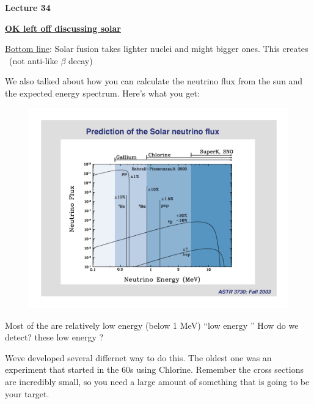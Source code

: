 \usepackage{fancyhdr}

\fancyhf{}


\thispagestyle{fancy}

\begin{center}
{\huge \textbf{Lecture 34}}
\end{center}

{\fontsize{14}{16}\selectfont

\textbf{\underline{OK left off discussing solar \nus}} 

\underline{Bottom line}: Solar fusion takes lighter nuclei and might bigger ones.  
This creates \nus\ (not anti-\nus like $\beta$ decay)

We also talked about how you can calculate the neutrino flux from the sun and the expected energy spectrum.
Here's what you get:

\begin{figure}[h!]
\centering
\includegraphics[width=1.0\textwidth]{./NuFromSun.pdf}
\end{figure}

Most of the \nus are relatively low energy (below 1 MeV) ``low energy \nus''
How do we detect? these low energy \nus ?

Weve developed several differnet way to do this. 
The oldest one was an experiment that started in the 60s using Chlorine. 
Remember the cross sections are incredibly small, so you need a large amount of something that is going to be your target. 

}
